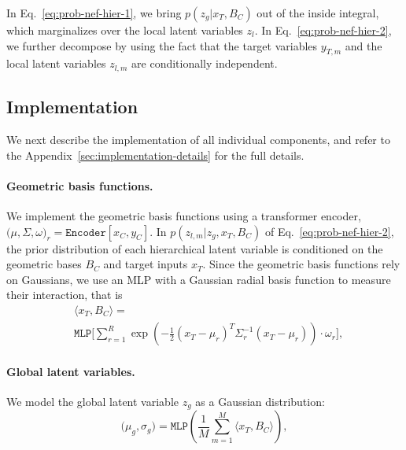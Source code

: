 %
In Eq.~\eqref{eq:prob-nef-hier-1}, we bring $p(z_g | x_T, B_C)$ out of the inside integral, which marginalizes over the local latent variables $z_l$.
In Eq.~\eqref{eq:prob-nef-hier-2}, we further decompose by using the fact that the target variables $y_{T, m}$ and the local latent variables $z_{l, m}$ are conditionally independent. 

\subsection{Implementation}

We next describe the implementation of all individual components, and refer to the Appendix~\ref{sec:implementation-details}  for the full details.

\paragraph{Geometric basis functions.} We implement the geometric basis functions using a transformer encoder, $ \Big(\mu, \Sigma, \omega \Big)_r = \texttt{Encoder} [x_C, y_C]$.
In $p(z_{l, m} | z_g, x_T, B_C)$ of Eq.~\eqref{eq:prob-nef-hier-2}, the prior distribution of each hierarchical latent variable is conditioned on the geometric bases $B_C$ and target inputs $x_T$. 
Since the geometric basis functions rely on Gaussians, we use an MLP with a Gaussian radial basis function to measure their interaction, that is
%
\begin{equation}
\begin{aligned}
    &\langle x_T, B_C \rangle = \\
    &\texttt{MLP}\Big[\sum_{r=1}^R \exp (-\frac{1}{2}(x_T-\mu_r)^T \Sigma_r^{-1}(x_T-\mu_r) ) \cdot \omega_r\Big],
\label{eq:rbf_agg}
\end{aligned} 
\end{equation}
%

\paragraph{Global latent variables.}
We model the global latent variable \( z_g \) as a Gaussian distribution:  
\begin{equation}
        \big( \mu_g, \sigma_g \big)
    = \texttt{MLP}\left(\frac{1}{M}\sum_{m=1}^M 
    \langle x_T, B_C \rangle \right),
\label{eq:global-eq}
\end{equation}

